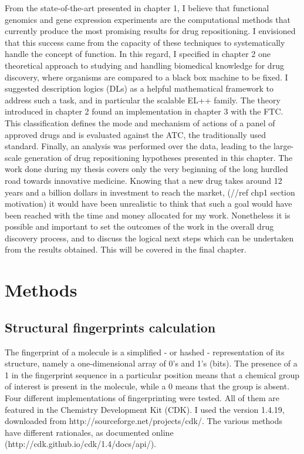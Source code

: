 From the state-of-the-art presented in chapter 1, I believe that functional genomics and gene expression experiments are the computational methods that currently produce the most promising results for drug repositioning. I envisioned that this success came from the capacity of these techniques to systematically handle the concept of function. In this regard, I specified in chapter 2 one theoretical approach to studying and handling biomedical knowledge for drug discovery, where organisms are compared to a black box machine to be fixed. I suggested description logics (DLs) as a helpful mathematical framework to address such a task, and in particular the scalable EL++ family. The theory introduced in chapter 2 found an implementation in chapter 3 with the FTC. This classification defines the mode and mechanism of actions of a panel of approved drugs and is evaluated against the ATC, the traditionally used standard. Finally, an analysis was performed over the data, leading to the large-scale generation of drug repositioning hypotheses presented in this chapter. The work done during my thesis covers only the very beginning of the long hurdled road towards innovative medicine. Knowing that a new drug takes around 12 years and a billion dollars in investment to reach the market, (//ref chp1 section motivation) it would have been unrealistic to think that such a goal would have been reached with the time and money allocated for my work. Nonetheless it is possible and important to set the outcomes of the work in the overall drug discovery process, and to discuss the logical next steps which can be undertaken from the results obtained. This will be covered in the final chapter.

\section{Methods}

\subsection{Structural fingerprints calculation}
The fingerprint of a molecule is a simplified - or hashed - representation of its structure, namely a one-dimensional array of 0’s and 1’s (bits). The presence of a 1 in the fingerprint sequence in a particular position means that a chemical group of interest is present in the molecule, while a 0 means that the group is absent. 
Four different implementations of fingerprinting were tested. All of them are featured in the Chemistry Development Kit (CDK). I used the version 1.4.19, downloaded from http://sourceforge.net/projects/cdk/. The various methods have different rationales, as documented online (http://cdk.github.io/cdk/1.4/docs/api/).

